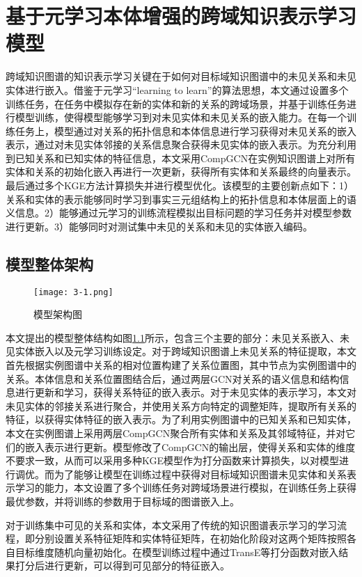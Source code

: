 \chapter{基于元学习本体增强的跨域知识表示学习模型}
跨域知识图谱的知识表示学习关键在于如何对目标域知识图谱中的未见关系和未见实体进行嵌入。借鉴于元学习“learning to learn”的算法思想，本文通过设置多个训练任务，在任务中模拟存在新的实体和新的关系的跨域场景，并基于训练任务进行模型训练，使得模型能够学习到对未见实体和未见关系的嵌入能力。在每一个训练任务上，模型通过对关系的拓扑信息和本体信息进行学习获得对未见关系的嵌入表示，通过对未见实体邻接的关系信息聚合获得未见实体的嵌入表示。为充分利用到已知关系和已知实体的特征信息，本文采用CompGCN在实例知识图谱上对所有实体和关系的初始化嵌入再进行一次更新，获得所有实体和关系最终的向量表示。最后通过多个KGE方法计算损失并进行模型优化。该模型的主要创新点如下：1）关系和实体的表示能够同时学习到事实三元组结构上的拓扑信息和本体层面上的语义信息。2）能够通过元学习的训练流程模拟出目标问题的学习任务并对模型参数进行更新。3）能够同时对测试集中未见的关系和未见的实体嵌入编码。

\section{模型整体架构}
\begin{figure}[h]
  \centering
  \texttt{[image: 3-1.png]}
  \caption{模型架构图}
  \label{fig:3-1}
\end{figure}

本文提出的模型整体结构如图\ref{fig:3-1}所示，包含三个主要的部分：未见关系嵌入、未见实体嵌入以及元学习训练设定。对于跨域知识图谱上未见关系的特征提取，本文首先根据实例图谱中关系的相对位置构建了关系位置图，其中节点为实例图谱中的关系。本体信息和关系位置图结合后，通过两层GCN对关系的语义信息和结构信息进行更新和学习，获得关系特征的嵌入表示。对于未见实体的表示学习，本文对未见实体的邻接关系进行聚合，并使用关系方向特定的调整矩阵，提取所有关系的特征，以获得实体特征的嵌入表示。为了利用实例图谱中的已知关系和已知实体，本文在实例图谱上采用两层CompGCN聚合所有实体和关系及其邻域特征，并对它们的嵌入表示进行更新。模型修改了CompGCN的输出层，使得关系和实体的维度不要求一致，从而可以采用多种KGE模型作为打分函数来计算损失，以对模型进行调优。而为了能够让模型在训练过程中获得对目标域知识图谱未见实体和关系表示学习的能力，本文设置了多个训练任务对跨域场景进行模拟，在训练任务上获得最优参数，并将训练的参数用于目标域的图谱嵌入上。

对于训练集中可见的关系和实体，本文采用了传统的知识图谱表示学习的学习流程，即分别设置关系特征矩阵和实体特征矩阵，在初始化阶段对这两个矩阵按照各自目标维度随机向量初始化。在模型训练过程中通过TransE等打分函数对嵌入结果打分后进行更新，可以得到可见部分的特征嵌入。

